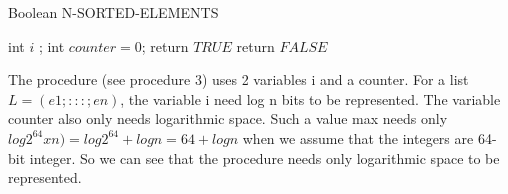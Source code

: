 \documentclass [11pt]{article}
\begin{document}
\begin{algorithm}
\caption{Boolean N-SORTED-ELEMENTS }
\label{Bsort}
\begin{algorithmic}

 \State int $i$ ;
 \State int $counter = 0$;
     return $TRUE$
   \EndIf
  \EndIf
 \EndFor
 \State return $FALSE$
\EndFunction
\end{algorithmic}
\end{algorithm}

\medskip
The procedure (see procedure 3) uses 2 variables i  and a  counter. For a list $ L = (e1; : : : ; en) $,
the variable i need log n bits to be represented. The
variable counter also only needs logarithmic space. Such a value max needs only
$ log 2^64 x n) = log 2^64 + log n = 64 + log n$ when we assume that the integers are 64-bit integer.
So we can see that the procedure needs only logarithmic space to be represented.
\end{document}
